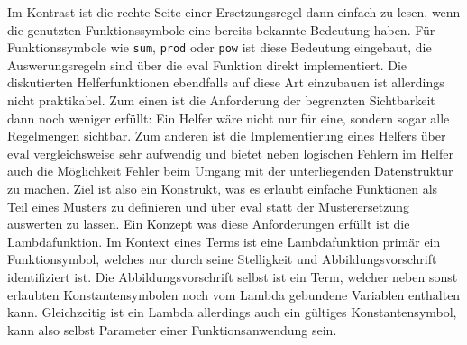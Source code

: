 Im Kontrast ist die rechte Seite einer Ersetzungsregel dann einfach zu lesen, wenn die genutzten Funktionssymbole eine bereits bekannte Bedeutung haben. Für Funktionssymbole wie \texttt{sum}, \texttt{prod} oder \texttt{pow} ist diese Bedeutung eingebaut, die Auswerungsregeln sind über die $\mathrm{eval}$ Funktion direkt implementiert. Die diskutierten Helferfunktionen ebendfalls auf diese Art einzubauen ist allerdings nicht praktikabel. Zum einen ist die Anforderung der begrenzten Sichtbarkeit dann noch weniger erfüllt: Ein Helfer wäre nicht nur für eine, sondern sogar alle Regelmengen sichtbar. Zum anderen ist die Implementierung eines Helfers über $\mathrm{eval}$ vergleichsweise sehr aufwendig und bietet neben logischen Fehlern im Helfer auch die Möglichkeit Fehler beim Umgang mit der unterliegenden Datenstruktur zu machen. Ziel ist also ein Konstrukt, was es erlaubt einfache Funktionen als Teil eines Musters zu definieren und über $\mathrm{eval}$ statt der Musterersetzung auswerten zu lassen. 
Ein Konzept was diese Anforderungen erfüllt ist die Lambdafunktion. Im Kontext eines Terms ist eine Lambdafunktion primär ein Funktionsymbol, welches nur durch seine Stelligkeit und Abbildungsvorschrift identifiziert ist. Die Abbildungsvorschrift selbst ist ein Term, welcher neben sonst erlaubten Konstantensymbolen noch vom Lambda gebundene Variablen enthalten kann. Gleichzeitig ist ein Lambda allerdings auch ein gültiges Konstantensymbol, kann also selbst Parameter einer Funktionsanwendung sein.


